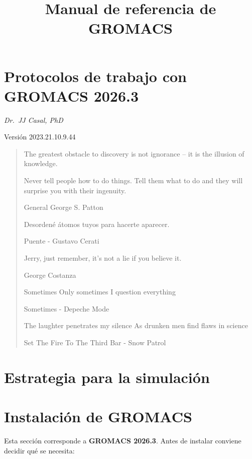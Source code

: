 \documentclass[
  spanish,
  11pt,
  a4paper]{article}
\title{Manual de referencia de GROMACS}
\author{}
\date{\vspace{-2.5em}}
\begin{document}
\maketitle

{
\setcounter{tocdepth}{3}
\tableofcontents
}
\section{Protocolos de trabajo con GROMACS
2026.3}\label{protocolos-de-trabajo-con-gromacs-2026.3}

\emph{Dr.~JJ Casal, PhD}

Versión 2023.21.10.9.44

\begin{quote}
The greatest obstacle to discovery is not ignorance -- it is the
illusion of knowledge.

Never tell people how to do things. Tell them what to do and they will
surprise you with their ingenuity.

General George S. Patton

Desordené átomos tuyos para hacerte aparecer.

Puente - Gustavo Cerati

Jerry, just remember, it's not a lie if you believe it.

George Costanza

Sometimes Only sometimes I question everything

Sometimes - Depeche Mode

The laughter penetrates my silence As drunken men find flaws in science

Set The Fire To The Third Bar - Snow Patrol
\end{quote}

\section{Estrategia para la
simulación}\label{estrategia-para-la-simulaciuxf3n}

\section{Instalación de GROMACS}\label{instalaciuxf3n-de-gromacs}

Esta sección corresponde a \textbf{GROMACS 2026.3}. Antes de instalar
conviene decidir qué se necesita:
\end{document}
